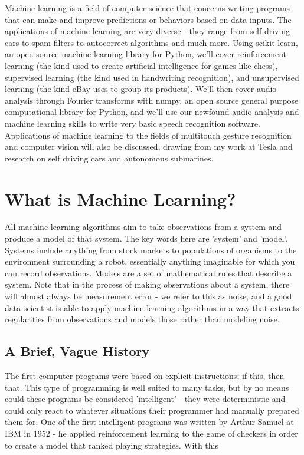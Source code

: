 \documentclass[11pt]{article}
\begin{document}
Machine learning is a field of computer science that concerns writing programs that can make and improve predictions or behaviors based on data inputs. The applications of machine learning are very diverse - they range from self driving cars to spam filters to autocorrect algorithms and much more. Using scikit-learn, an open source machine learning library for Python, we'll cover reinforcement learning (the kind used to create artificial intelligence for games like chess), supervised learning (the kind used in handwriting recognition), and unsupervised learning (the kind eBay uses to group its products). We'll then cover audio analysis through Fourier transforms with numpy, an open source general purpose computational library for Python, and we'll use our newfound audio analysis and machine learning skills to write very basic speech recognition software. Applications of machine learning to the fields of multitouch gesture recognition and computer vision will also be discussed, drawing from my work at Tesla and research on self driving cars and autonomous submarines.


\section{What is Machine Learning?}
All machine learning algorithms aim to take observations from a system and produce a model of that system. The key words here are 'system' and 'model'. Systems include anything from stock markets to populations of organisms to the environment surrounding a robot, essentially anything imaginable for which you can record observations. Models are a set of mathematical rules that describe a system. Note that in the process of making observations about a system, there will almost always be measurement error - we refer to this as noise, and a good data scientist is able to apply machine learning algorithms in a way that extracts regularities from observations and models those rather than modeling noise.
\subsection{A Brief, Vague History}
The first computer programs were based on explicit instructions; if this, then that. This type of programming is well suited to many tasks, but by no means could these programs be considered 'intelligent' - they were deterministic and could only react to whatever situations their programmer had manually prepared them for. One of the first intelligent programs was written by Arthur Samuel at IBM in 1952 - he applied reinforcement learning to the game of checkers in order to create a model that ranked playing strategies. With this 
\end{document}
